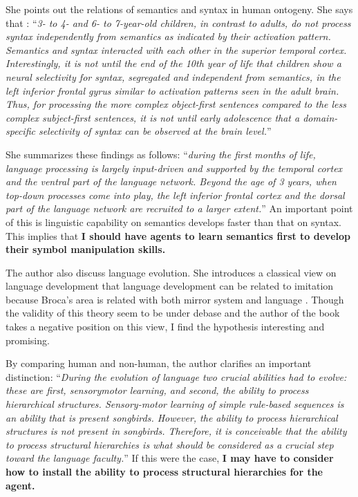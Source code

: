 \documentclass[12pt]{article}
\begin{document}
She points out the relations of semantics and syntax in human ontogeny. She 
says that : ``\textit{3- to 4- and 6- to 7-year-old children, in contrast to
adults, do not process syntax independently from semantics as indicated by their activation
pattern. Semantics and syntax interacted with each other in the superior temporal cortex.
Interestingly, it is not until the end of the 10th year of life that children show a neural selectivity
for syntax, segregated and independent from semantics, in the left inferior frontal
gyrus similar to activation patterns seen in the adult brain. Thus, for processing the more
complex object-first sentences compared to the less complex subject-first sentences, it is
not until early adolescence that a domain-specific selectivity of syntax can be observed at
the brain level.}''

She summarizes these findings as follows: 
``\textit{during the
first months of life, language processing is largely input-driven and supported by the temporal
cortex and the ventral part of the language network. Beyond the age of 3 years, when
top-down processes come into play, the left inferior frontal cortex and the dorsal part of the
language network are recruited to a larger extent.}'' An important point of this is 
linguistic capability on semantics develops faster than that on syntax. This implies that 
\textbf{I should have agents to learn semantics first to develop their symbol manipulation skills.}

The author also discuss language evolution. She introduces a classical view on language development that 
language development can be related to imitation because Broca’s area is related with both 
mirror system and language \cite{Iacoboni99,Iacoboni05}. Though the validity of this theory seem to be 
under debase and the author of the book takes a negative position on this view, I find the hypothesis 
interesting and promising. 

By comparing human and non-human, the author clarifies an important distinction: 
``\textit{During the evolution of language two crucial abilities had to evolve: these are first, sensorymotor
learning, and second, the ability to process hierarchical structures. Sensory-motor
learning of simple rule-based sequences is an ability that is present songbirds. However,
the ability to process hierarchical structures is not present in songbirds. Therefore, it is
conceivable that the ability to process structural hierarchies is what should be considered
as a crucial step toward the language faculty.}'' If this were the case, \textbf{I may have to consider how to 
install the ability to process structural hierarchies for the agent.} 
\end{document}

